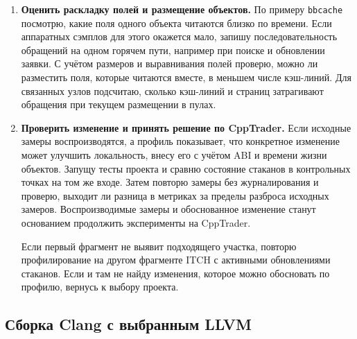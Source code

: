 \documentclass[a4paper,12pt]{article}
\begin{document}
\begin{enumerate}
    \item \textbf{Оценить раскладку полей и размещение объектов.}
    По примеру \texttt{bbcache} посмотрю, какие поля одного объекта читаются
    близко по времени. Если аппаратных сэмплов для этого окажется мало,
    запишу последовательность обращений на одном горячем пути, например
    при поиске и обновлении заявки. С учётом размеров и выравнивания полей
    проверю, можно ли разместить поля, которые читаются вместе, в меньшем
    числе кэш-линий. Для связанных узлов подсчитаю, сколько кэш-линий
    и страниц затрагивают обращения при текущем размещении в пулах.

    \item \textbf{Проверить изменение и принять решение по CppTrader.}
    Если исходные замеры воспроизводятся, а профиль показывает, что
    конкретное изменение может улучшить локальность, внесу его с учётом
    ABI и времени жизни объектов. Запущу тесты проекта и сравню состояние
    стаканов в контрольных точках на том же входе. Затем повторю замеры
    без журналирования и проверю, выходит ли разница в метриках за пределы
    разброса исходных замеров. Воспроизводимые замеры и обоснованное
    изменение станут основанием продолжить эксперименты на CppTrader.

    Если первый фрагмент не выявит подходящего участка, повторю
    профилирование на другом фрагменте ITCH с активными обновлениями
    стаканов. Если и там не найду изменения, которое можно обосновать
    по профилю, вернусь к выбору проекта.
\end{enumerate}

\subsection{Сборка Clang с выбранным LLVM}
\end{document}

